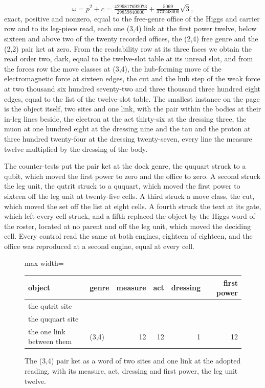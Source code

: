 \begin{chproof}
\begin{equation}
\omega = p^{2} + c = \tfrac{4299817692073}{29859840000} + \tfrac{5069}{373248000}\sqrt{3} ,
\end{equation}
exact, positive and nonzero, equal to the free-genre office of the Higgs and carrier row and to its leg-piece read, each one (3,4) link at the first power twelve, below sixteen and above two of the twenty recorded offices, the (2,4) free genre and the (2,2) pair ket at zero. From the readability row at its three faces we obtain the read order two, dark, equal to the twelve-slot table at its unread slot, and from the forces row the move classes at (3,4), the hub-forming move of the electromagnetic force at sixteen edges, the cut and the hub step of the weak force at two thousand six hundred seventy-two and three thousand three hundred eight edges, equal to the list of the twelve-slot table. The smallest instance on the page is the object itself, two sites and one link, with the pair within the bodies at their in-leg lines beside, the electron at the act thirty-six at the dressing three, the muon at one hundred eight at the dressing nine and the tau and the proton at three hundred twenty-four at the dressing twenty-seven, every line the measure twelve multiplied by the dressing of the body.

The counter-tests put the pair ket at the dock genre, the ququart struck to a qubit, which moved the first power to zero and the office to zero. A second struck the leg unit, the qutrit struck to a ququart, which moved the first power to sixteen off the leg unit at twenty-five cells. A third struck a move class, the cut, which moved the set off the list at eight cells. A fourth struck the text at its gate, which left every cell struck, and a fifth replaced the object by the Higgs word of the roster, located at no parent and off the leg unit, which moved the deciding cell. Every control read the same at both engines, eighteen of eighteen, and the office was reproduced at a second engine, equal at every cell.
\end{chproof}
\begin{figure}[h]\centering
\begin{adjustbox}{max width=\linewidth}\begin{tabular}{llrrrr}\toprule
object & genre & measure & act & dressing & first power \\ \midrule
the qutrit site & & & & & \\
the ququart site & & & & & \\
the one link between them & (3,4) & 12 & 12 & 1 & 12 \\ \bottomrule
\end{tabular}\end{adjustbox}
\caption{The (3,4) pair ket as a word of two sites and one link at the adopted reading, with its measure, act, dressing and first power, the leg unit twelve.}
\end{figure}
\par\medskip{}\label{narr:close:2-1}\par
